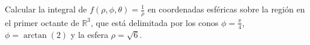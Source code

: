



Calcular la integral de \( f(\rho, \phi, \theta) = \frac{1}{\rho} \) en coordenadas esféricas sobre la región en el primer octante de \( \mathbb{R}^3 \), que está delimitada por los conos \( \phi = \frac{\pi}{4} \), \( \phi = \arctan(2) \) y la esfera \( \rho = \sqrt{6} \).


